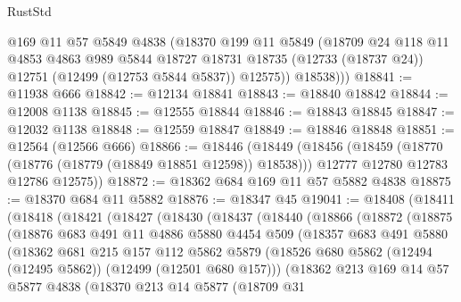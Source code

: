 \begin{lexlean}{RustStd}
\begin{coremodule}
{\begin{coremodule}
{{{{{{{{{{{{{{{{{{{{{{{{{{{{{{{{{{{{{{{{{{{{{{{{{{{{{{{{{{{{{{{{{{{{{{{{{{{{{{{{          @169
          @11
          @57
          @5849
          @4838
          (@18370
            @199
            @11
            @5849
            (@18709
              @24
              @118
              @11
              @4853
              @4863
              @989
              @5844
              @18727
              @18731
              @18735
              (@12733 (@18737 @24))
              @12751
              (@12499 (@12753 @5844 @5837))
              @12575))
          @18538)))
@18841 := @11938 @666
@18842 := @12134 @18841
@18843 := @18840 @18842
@18844 := @12008 @1138
@18845 := @12555 @18844
@18846 := @18843 @18845
@18847 := @12032 @1138
@18848 := @12559 @18847
@18849 := @18846 @18848
@18851 := @12564 (@12566 @666)
@18866 := @18446
    (@18449
      (@18456
        (@18459 (@18770 (@18776 (@18779 (@18849 @18851 @12598)) @18538)))
        @12777
        @12780
        @12783
        @12786
        @12575))
@18872 := @18362 @684 @169 @11 @57 @5882 @4838
@18875 := @18370 @684 @11 @5882
@18876 := @18347 @45
@19041 := @18408
    (@18411
      (@18418
        (@18421
          (@18427
            (@18430
              (@18437
                (@18440
                  (@18866
                    (@18872
                      (@18875
                        (@18876
                          @683
                          @491
                          @11
                          @4886
                          @5880
                          @4454
                          @509
                          (@18357
                            @683
                            @491
                            @5880
                            (@18362
                              @681
                              @215
                              @157
                              @112
                              @5862
                              @5879
                              (@18526
                                @680
                                @5862
                                (@12494 (@12495 @5862))
                                (@12499 (@12501 @680 @157)))
                              (@18362
                                @213
                                @169
                                @14
                                @57
                                @5877
                                @4838
                                (@18370
                                  @213
                                  @14
                                  @5877
                                  (@18709
                                    @31
}}}}}}}}}}}}}}}}}}}}}}}}}}}}}}}}}}}}}}}}}}}}}}}}}}}}}}}}}}}}}}}}}}}}}}}}}}}}}}}}
\end{coremodule}}
\end{coremodule}
\end{lexlean}
